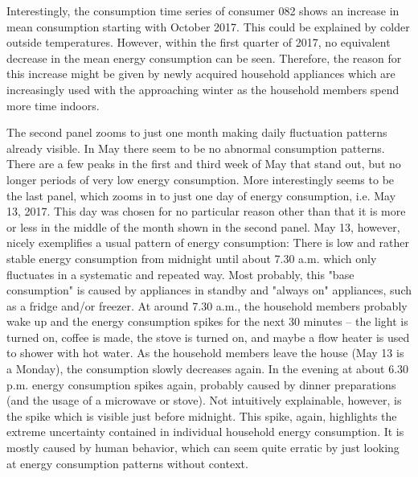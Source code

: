 Interestingly, the consumption time series of consumer 082 shows an increase in mean consumption starting with October 2017. This could be explained by colder outside temperatures. However, within the first quarter of 2017, no equivalent decrease in the mean energy consumption can be seen. Therefore, the reason for this increase might be given by newly acquired household appliances which are increasingly used with the approaching winter as the household members spend more time indoors.

The second panel zooms to just one month making daily fluctuation patterns already visible. In May there seem to be no abnormal consumption patterns. There are a few peaks in the first and third week of May that stand out, but no longer periods of very low energy consumption. More interestingly seems to be the last panel, which zooms in to just one day of energy consumption, i.e. May 13, 2017. This day was chosen for no particular reason other than that it is more or less in the middle of the month shown in the second panel. May 13, however, nicely exemplifies a usual pattern of energy consumption: There is low and rather stable energy consumption from midnight until about 7.30 a.m. which only fluctuates in a systematic and repeated way. Most probably, this "base consumption" is caused by appliances in standby and "always on" appliances, such as a fridge and/or freezer. At around 7.30 a.m., the household members probably wake up and the energy consumption spikes for the next 30 minutes -- the light is turned on, coffee is made, the stove is turned on, and maybe a flow heater is used to shower with hot water. As the household members leave the house (May 13 is a Monday), the consumption slowly decreases again. In the evening at about 6.30 p.m. energy consumption spikes again, probably caused by dinner preparations (and the usage of a microwave or stove). Not intuitively explainable, however, is the spike which is visible just before midnight. This spike, again, highlights the extreme uncertainty contained in individual household energy consumption. It is mostly caused by human behavior, which can seem quite erratic by just looking at energy consumption patterns without context.

